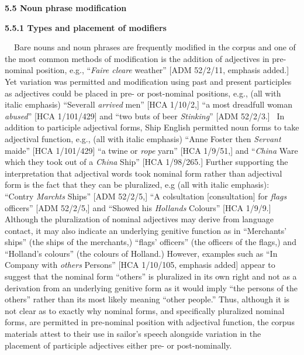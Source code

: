 \begin{styleStandard}
\textbf{5.5 Noun phrase modification }
\end{styleStandard}


\begin{styleStandard}
\textbf{5.5.1 Types and placement of modifiers}
\end{styleStandard}


\begin{styleStandard}
\textbf{\ \ }Bare nouns and noun phrases are frequently modified in the corpus and one of the most common methods of modification is the addition of adjectives in pre-nominal position, e.g., “\textit{Faire cleare} weather” [ADM 52/2/11, emphasis added.] Yet variation was permitted and modification using past and present participles as adjectives could be placed in pre- or post-nominal positions, e.g., (all with italic emphasis) “Severall \textit{arrived} men” [HCA 1/10/2,] “a most dreadfull woman \textit{abused}” [HCA 1/101/429] and “two buts of beer \textit{Stinking}” [ADM 52/2/3.] \ In addition to participle adjectival forms, Ship English permitted noun forms to take adjectival function, e.g., (all with italic emphasis) “Anne Foster then \textit{Servant} maide” [HCA 1/101/429] “a twine or \textit{rope} yarn” [HCA 1/9/51,] and “\textit{China }Ware which they took out of a \textit{China} Ship” [HCA 1/98/265.] Further supporting the interpretation that adjectival words took nominal form rather than adjectival form is the fact that they can be pluralized, e.g (all with italic emphasis): “Contry \textit{Marchts} Ships” [ADM 52/2/5,] “A colsultation [consultation] for\textit{ flags} officers” [ADM 52/2/5,] and “Showed his \textit{Hollands} Colours” [HCA 1/9/9.] Although the pluralization of nominal adjectives may derive from language contact, it may also indicate an underlying genitive function as in “Merchants’ ships” (the ships of the merchants,) “flags’ officers” (the officers of the flags,) and “Holland’s colours” (the colours of Holland.) However, examples such as “In Company with\textit{ others} Persons” [HCA 1/10/105, emphasis added] appear to suggest that the nominal form “others” is pluralized in its own right and not as a derivation from an underlying genitive form as it would imply “the persons of the others” rather than its most likely meaning “other people.” Thus, although it is not clear as to exactly why nominal forms, and specifically pluralized nominal forms, are permitted in pre-nominal position with adjectival function, the corpus materials attest to their use in sailor’s speech alongside variation in the placement of participle adjectives either pre- or post-nominally. 
\end{styleStandard}


